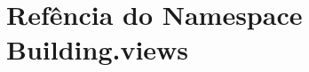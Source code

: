 \hypertarget{namespaceBuilding_1_1views}{\section{Refência do Namespace Building.\-views}
\label{namespaceBuilding_1_1views}
}
